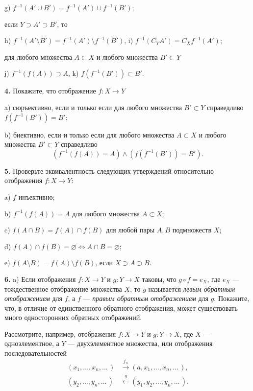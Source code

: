 g) $f^{-1}(A' \cup B') = f^{-1}(A') \cup f^{-1}(B')$;

если $Y \supset A' \supset B'$, то

h) $f^{-1}(A' \setminus B') = f^{-1}(A') \setminus f^{-1}(B')$, \qquad i) $f^{-1}(C_Y A') = C_X f^{-1}(A')$;

для любого множества $A \subset X$ и любого множества $B' \subset Y$

j) $f^{-1}(f(A)) \supset A$, \qquad k) $f(f^{-1}(B')) \subset B'$.

\medskip

\textbf{4.} Покажите, что отображение $f \colon X \to Y$

a) сюръективно, если и только если для любого множества $B' \subset Y$ справедливо
$f(f^{-1}(B')) = B'$;

b) биективно, если и только если для любого множества $A \subset X$ и любого множества $B' \subset Y$ справедливо
\[
  (f^{-1}(f(A)) = A) \land (f(f^{-1}(B')) = B').
\]

\medskip

\textbf{5.} Проверьте эквивалентность следующих утверждений относительно отображения $f \colon X \to Y$:

a) $f$ инъективно;

b) $f^{-1}(f(A)) = A$ для любого множества $A \subset X$;

c) $f(A \cap B) = f(A) \cap f(B)$ для любой пары $A, B$ подмножеств $X$;

d) $f(A) \cap f(B) = \varnothing \Leftrightarrow A \cap B = \varnothing$;

e) $f(A \setminus B) = f(A) \setminus f(B)$, если $X \supset A \supset B$.

\medskip

\textbf{6.} a) Если отображения $f \colon X \to Y$ и $g \colon Y \to X$ таковы, что $g \circ f = e_X$, где $e_X$ --- тождественное отображение множества $X$, то $g$ называется \textit{левым обратным отображением} для $f$, а $f$ --- \textit{правым обратным отображением} для $g$. Покажите, что, в отличие от единственного
обратного отображения, может существовать много односторонних обратных отображений.

Рассмотрите, например, отображения $f \colon X \to Y$ и $g \colon Y \to X$, где $X$ --- одноэлементное, а $Y$ --- двухэлементное множества, или отображения последовательностей
\begin{align*}
  (x_1, \ldots, x_n, \ldots\,) &\xrightarrow{f_n} (a, x_1, \ldots, x_n, \ldots\,), \\
  (y_2, \ldots, y_n, \ldots\,) &\xleftarrow{g} (y_1, y_2, \ldots, y_n, \ldots\,).
\end{align*}

